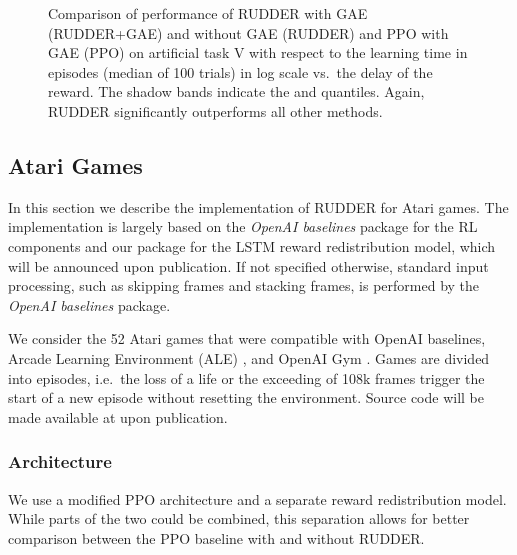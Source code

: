 \documentclass{article}
\newcommand{\figpath}{figures/}
\begin{document}
\begin{appendices}
\begin{figure}[h]
 \centering \resizebox{0.7\linewidth}{!}{}
\caption{Comparison of performance of RUDDER with GAE (RUDDER+GAE) and without GAE (RUDDER) and PPO with GAE (PPO) on artificial task V
with respect to the learning time in episodes (median of 100 trials) in log scale
vs.\ the delay of the reward.
The shadow bands indicate the  and  quantiles.
Again, RUDDER significantly outperforms all other methods.\label{fig:ppo}}\end{figure}



















\subsection{Atari Games}
\label{sec:Aatari}
In this section we describe the implementation of RUDDER for Atari games.
The implementation is largely based on the {\em OpenAI baselines}
package \cite{Dhariwal:17} for the RL components and our package
for the LSTM reward redistribution model, which will be announced upon publication.
If not specified otherwise, standard input processing, such as skipping  frames and stacking  frames, 
is performed by the {\em OpenAI baselines} package.

We consider the 52 Atari games that were compatible with OpenAI baselines,
Arcade Learning Environment (ALE) \cite{Bellemare:13}, and OpenAI Gym \cite{Brockman:16}.
Games are divided into episodes,
i.e.\ the loss of a life or the exceeding of 108k frames
trigger the start of a new episode without resetting the environment.
Source code will be made available at upon publication.

\subsubsection{Architecture}
\label{sec:Aatari-arch}
We use a modified PPO architecture and a separate reward redistribution model. While parts of the two could be combined, this separation allows for better comparison between the PPO baseline with and without RUDDER.


\end{appendices}
\end{document}
